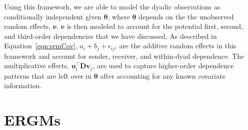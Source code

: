 \documentclass[12pt,pdflatex]{elsarticle}
\begin{document}
Using this framework, we are able to model the dyadic observations as conditionally independent given $\bm\theta$, where $\bm\theta$ depends on the the unobserved random effects, $\mathbf{e}$. $\mathbf{e}$ is then modeled to account for the potential first, second, and third-order dependencies that we have discussed. As described in Equation~\ref{eqn:srmCov}, $a_{i} + b_{j}  + \epsilon_{ij}$, are the additive random effects in this framework and account for sender, receiver, and within-dyad dependence. The multiplicative effects, $\textbf{u}_{i}^{\top} \textbf{D} \textbf{v}_{j}$, are used to capture higher-order dependence patterns that are left over in $\bm\theta$ after accounting for any known covariate information. %

\section*{\textbf{ERGMs}}

\end{document}
